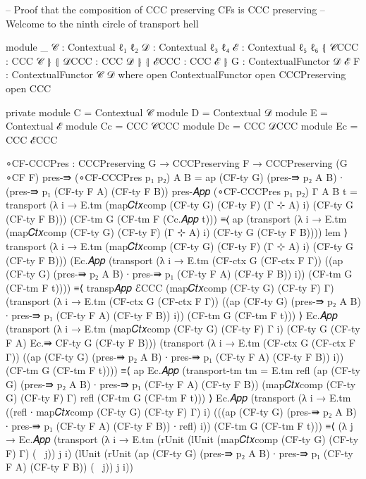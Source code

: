 \begin{code}[hide]
-- Proof that the composition of CCC preserving CFs is CCC preserving
-- Welcome to the ninth circle of transport hell

module _ {𝒞 : Contextual ℓ₁ ℓ₂} {𝒟 : Contextual ℓ₃ ℓ₄} {ℰ : Contextual ℓ₅ ℓ₆}
         ⦃ 𝒞CCC : CCC 𝒞 ⦄ ⦃ 𝒟CCC : CCC 𝒟 ⦄ ⦃ ℰCCC : CCC ℰ ⦄
         {G : ContextualFunctor 𝒟 ℰ} {F : ContextualFunctor 𝒞 𝒟} where
  open ContextualFunctor
  open CCCPreserving
  open CCC

  private
    module C = Contextual 𝒞
    module D = Contextual 𝒟
    module E = Contextual ℰ
    module Cc = CCC 𝒞CCC
    module Dc = CCC 𝒟CCC
    module Ec = CCC ℰCCC

  ∘CF-CCCPres : CCCPreserving G → CCCPreserving F → CCCPreserving (G ∘CF F)
  pres-⇛ (∘CF-CCCPres p₁ p₂) A B =
    ap (CF-ty G) (pres-⇛ p₂ A B) ∙ (pres-⇛ p₁ (CF-ty F A) (CF-ty F B))
  pres-𝐴𝑝𝑝 (∘CF-CCCPres p₁ p₂) {Γ} {A} {B} t =
    transport (λ i → E.tm (map𝐶𝑡𝑥comp (CF-ty G) (CF-ty F) (Γ ⊹ A) i) (CF-ty G (CF-ty F B)))
      (CF-tm G (CF-tm F (Cc.𝐴𝑝𝑝 t)))
      ≡⟨ ap (transport (λ i → E.tm (map𝐶𝑡𝑥comp (CF-ty G) (CF-ty F) (Γ ⊹ A) i)
        (CF-ty G (CF-ty F B)))) lem ⟩
    transport (λ i → E.tm (map𝐶𝑡𝑥comp (CF-ty G) (CF-ty F) (Γ ⊹ A) i) (CF-ty G (CF-ty F B)))
      (Ec.𝐴𝑝𝑝 (transport (λ i → E.tm (CF-ctx G (CF-ctx F Γ)) ((ap (CF-ty G) (pres-⇛ p₂ A B)
        ∙ pres-⇛ p₁ (CF-ty F A) (CF-ty F B)) i)) (CF-tm G (CF-tm F t))))
      ≡⟨ transp𝐴𝑝𝑝 ℰCCC (map𝐶𝑡𝑥comp (CF-ty G) (CF-ty F) Γ) (transport (λ i → E.tm
        (CF-ctx G (CF-ctx F Γ)) ((ap (CF-ty G) (pres-⇛ p₂ A B)
        ∙ pres-⇛ p₁ (CF-ty F A) (CF-ty F B)) i)) (CF-tm G (CF-tm F t))) ⟩
    Ec.𝐴𝑝𝑝 (transport
      (λ i → E.tm (map𝐶𝑡𝑥comp (CF-ty G) (CF-ty F) Γ i)
        (CF-ty G (CF-ty F A) Ec.⇛ CF-ty G (CF-ty F B)))
      (transport
        (λ i → E.tm (CF-ctx G (CF-ctx F Γ)) ((ap (CF-ty G) (pres-⇛ p₂ A B)
          ∙ pres-⇛ p₁ (CF-ty F A) (CF-ty F B)) i))
        (CF-tm G (CF-tm F t))))
      ≡⟨ ap Ec.𝐴𝑝𝑝 (transport-tm {tm = E.tm} refl (ap (CF-ty G) (pres-⇛ p₂ A B)
        ∙ pres-⇛ p₁ (CF-ty F A) (CF-ty F B)) (map𝐶𝑡𝑥comp (CF-ty G) (CF-ty F) Γ) refl
        (CF-tm G (CF-tm F t))) ⟩
    Ec.𝐴𝑝𝑝 (transport (λ i → E.tm
      ((refl ∙ map𝐶𝑡𝑥comp (CF-ty G) (CF-ty F) Γ) i)
      (((ap (CF-ty G) (pres-⇛ p₂ A B) ∙ pres-⇛ p₁ (CF-ty F A) (CF-ty F B)) ∙ refl) i))
      (CF-tm G (CF-tm F t)))
      ≡⟨ (λ j → Ec.𝐴𝑝𝑝 (transport (λ i → E.tm
        (rUnit (lUnit (map𝐶𝑡𝑥comp (CF-ty G) (CF-ty F) Γ) (~ j)) j i)
        (lUnit (rUnit (ap (CF-ty G) (pres-⇛ p₂ A B)
          ∙ pres-⇛ p₁ (CF-ty F A) (CF-ty F B)) (~ j)) j i))

\end{code}

